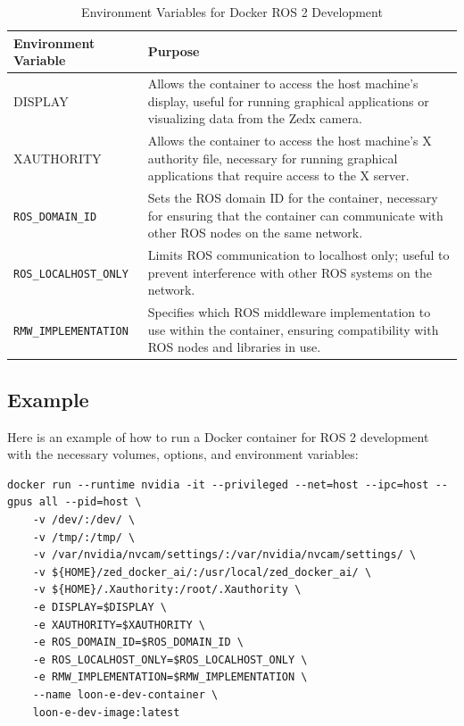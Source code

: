 \begin{table}[H]
    \centering
    \begin{tabular}{|l|p{10cm}|}
        \hline
        \textbf{Environment Variable} & \textbf{Purpose} \\
        \hline
        DISPLAY & Allows the container to access the host machine's display, useful for running graphical applications or visualizing data from the Zedx camera. \\
        \hline
        XAUTHORITY & Allows the container to access the host machine's X authority file, necessary for running graphical applications that require access to the X server. \\
        \hline
        \texttt{ROS\_DOMAIN\_ID} & Sets the ROS domain ID for the container, necessary for ensuring that the container can communicate with other ROS nodes on the same network. \\
        \hline
        \texttt{ROS\_LOCALHOST\_ONLY} & Limits ROS communication to localhost only; useful to prevent interference with other ROS systems on the network. \\
        \hline
        \texttt{RMW\_IMPLEMENTATION} & Specifies which ROS middleware implementation to use within the container, ensuring compatibility with ROS nodes and libraries in use. \\
        \hline
    \end{tabular}
    \caption{Environment Variables for Docker ROS 2 Development}
    \label{tab:docker-environment-variables}
\end{table}

\subsection{Example}

Here is an example of how to run a Docker container for ROS 2 development with the necessary volumes, options, and environment variables:

\begin{verbatim}
docker run --runtime nvidia -it --privileged --net=host --ipc=host --gpus all --pid=host \
	-v /dev/:/dev/ \
	-v /tmp/:/tmp/ \
	-v /var/nvidia/nvcam/settings/:/var/nvidia/nvcam/settings/ \
	-v ${HOME}/zed_docker_ai/:/usr/local/zed_docker_ai/ \
	-v ${HOME}/.Xauthority:/root/.Xauthority \
	-e DISPLAY=$DISPLAY \
	-e XAUTHORITY=$XAUTHORITY \
	-e ROS_DOMAIN_ID=$ROS_DOMAIN_ID \
	-e ROS_LOCALHOST_ONLY=$ROS_LOCALHOST_ONLY \
	-e RMW_IMPLEMENTATION=$RMW_IMPLEMENTATION \
	--name loon-e-dev-container \
	loon-e-dev-image:latest
\end{verbatim}

